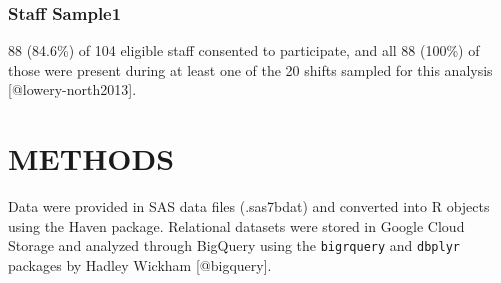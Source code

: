 \documentclass[
]{article}
\begin{document}
\hypertarget{staff-sample1}{%
\subsubsection{Staff Sample1}\label{staff-sample1}}

88 (84.6\%) of 104 eligible staff consented to participate, and all 88
(100\%) of those were present during at least one of the 20 shifts
sampled for this analysis {[}@lowery-north2013{]}.

\hypertarget{methods}{%
\section{METHODS}\label{methods}}

Data were provided in SAS data files (.sas7bdat) and converted into R
objects using the Haven package. Relational datasets were stored in
Google Cloud Storage and analyzed through BigQuery using the
\texttt{bigrquery} and \texttt{dbplyr} packages by Hadley Wickham
{[}@bigquery{]}.
\end{document}
